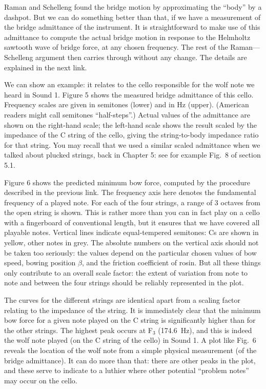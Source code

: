   Raman and Schelleng found the bridge motion by approximating the “body” by a 
  dashpot. But we can do something better than that, if we have a measurement 
  of the bridge admittance of the instrument. It is straightforward to make use 
  of this admittance to compute the actual bridge motion in response to the 
  Helmholtz sawtooth wave of bridge force, at any chosen frequency. The rest of 
  the Raman—Schelleng argument then carries through without any change. The 
  details are explained in the next link. 

  We can show an example: it relates to the cello responsible for the wolf note 
  we heard in Sound 1. Figure 5 shows the measured bridge admittance of this 
  cello. Frequency scales are given in semitones (lower) and in Hz (upper). 
  (American readers might call semitones ``half-steps''.) Actual values of the 
  admittance are shown on the right-hand scale; the left-hand scale shows the 
  result scaled by the impedance of the C string of the cello, giving the 
  string-to-body impedance ratio for that string. You may recall that we used a 
  similar scaled admittance when we talked about plucked strings, back in 
  Chapter 5: see for example Fig.\ 8 of section 5.1. 

  Figure 6 shows the predicted minimum bow force, computed by the procedure 
  described in the previous link. The frequency axis here denotes the 
  fundamental frequency of a played note. For each of the four strings, a range 
  of 3 octaves from the open string is shown. This is rather more than you can 
  in fact play on a cello with a fingerboard of conventional length, but it 
  ensures that we have covered all playable notes. Vertical lines indicate 
  equal-tempered semitones: Cs are shown in yellow, other notes in grey. The 
  absolute numbers on the vertical axis should not be taken too seriously: the 
  values depend on the particular chosen values of bow speed, bowing position 
  $\beta$, and the friction coefficient of rosin. But all these things only 
  contribute to an overall scale factor: the extent of variation from note to 
  note and between the four strings should be reliably represented in the plot. 

  The curves for the different strings are identical apart from a scaling 
  factor relating to the impedance of the string. It is immediately clear that 
  the minimum bow force for a given note played on the C string is 
  significantly higher than for the other strings. The highest peak occurs at 
  F$_3$ (174.6~Hz), and this is indeed the wolf note played (on the C string of 
  the cello) in Sound 1. A plot like Fig.\ 6 reveals the location of the wolf 
  note from a simple physical measurement (of the bridge admittance). It can do 
  more than that: there are other peaks in the plot, and these serve to 
  indicate to a luthier where other potential ``problem notes'' may occur on 
  the cello. 


